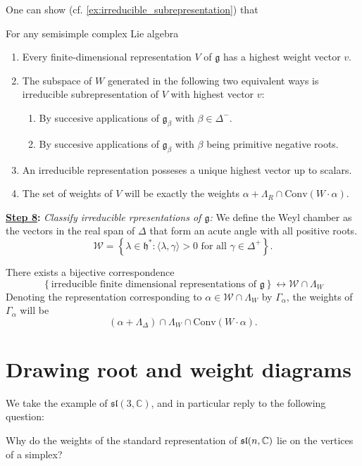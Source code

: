 \documentclass{report}
\begin{document}
One can show (cf. \cref{ex:irreducible_subrepresentation}) that
\begin{proposition}
    For any semisimple complex Lie algebra
    \begin{enumerate}[label = (\roman*)]
        \item Every finite-dimensional representation $V$ of $\mathfrak g$ has a highest weight vector $v$.
        \item The subspace of $W$ generated in the following two equivalent ways is irreducible subrepresentation of $V$ with highest vector $v$:
        \begin{enumerate}[label = (\alph*)]
            \item By succesive applications of $\mathfrak g_\beta$ with $\beta \in \Delta^-$.
            \item By succesive applications of $\mathfrak g_\beta$ with $\beta$ being primitive negative roots. 
        \end{enumerate}
        \item An irreducible representation posseses a unique highest vector up to scalars.
        \item The set of weights of $V$ will be exactly the weights $\alpha + \Lambda_R \cap \mathrm{Conv}(W \cdot \alpha)$.
    \end{enumerate}
\end{proposition}




{\bf \underline{Step 8}:} \emph{Classify irreducible rpresentations of $\mathfrak g$:}
We define the Weyl chamber as the vectors in the real span of $\Delta$ that form an acute angle with all positive roots.
\[
\mathcal W = \left\{ \lambda \in \mathfrak h^*: \langle \lambda, \gamma \rangle > 0 \text{ for all } \gamma \in \Delta^+ \right\}.
\]
\begin{theorem}
    There exists a bijective correspondence
    \[
    \left\{ \text{irreducible finite dimensional representations of } \mathfrak g \right\} \leftrightarrow \mathcal W \cap \Lambda_W
    \]
    Denoting the representation corresponding to $\alpha \in \mathcal W \cap \Lambda_W$ by $\Gamma_\alpha$, the weights of $\Gamma_\alpha$ will be $$(\alpha + \Lambda_\Delta) \cap \Lambda_W \cap \mathrm{Conv}(W \cdot \alpha).$$
\end{theorem}

\section{Drawing root and weight diagrams}
We take the example of $\mathfrak{sl}(3, \mathbb C)$, and in particular reply to the following question:
\begin{question}
    Why do the weights of the standard representation of $\operatorname{{\mathfrak{sl}}}(n, \mathbb C)$ lie on the vertices of a simplex?
\end{question}
\end{document}
